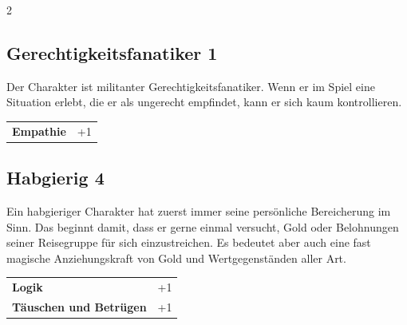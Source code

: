 \begin{multicols}{2}
\begin{tcolorbox}
\vspace{3mm}



\end{tcolorbox}

\begin{tcolorbox}
    \subsection*{Gerechtigkeitsfanatiker \hfill \small{1 }}
    \tcblower
Der Charakter ist militanter Gerechtigkeitsfanatiker. Wenn er im Spiel eine Situation erlebt, die er als ungerecht empfindet, kann er sich kaum kontrollieren.


\vspace{3mm}

\begin{tabular}{@{}ll@{}}
    \textbf{Empathie} & +1\\
\end{tabular}


\end{tcolorbox}

\begin{tcolorbox}
    \subsection*{Habgierig \hfill \small{4 }}
    \tcblower
Ein habgieriger Charakter hat zuerst immer seine persönliche Bereicherung im Sinn. Das beginnt damit, dass er gerne einmal versucht, Gold oder Belohnungen seiner Reisegruppe für sich einzustreichen. Es bedeutet aber auch eine fast magische Anziehungskraft von Gold und Wertgegenständen aller Art.


\vspace{3mm}

\begin{tabular}{@{}ll@{}}
    \textbf{Logik} & +1\\
    \textbf{Täuschen und Betrügen} & +1\\
\end{tabular}



\end{tcolorbox}
\end{multicols}

